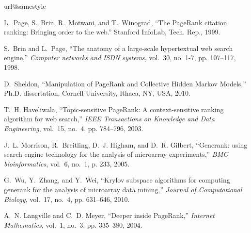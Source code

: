 \documentclass[conference]{IEEEtran}
\begin{document}
\else
\begin{thebibliography}{10}
\providecommand{\url}[1]{#1}
\csname url@samestyle\endcsname
\providecommand{\newblock}{\relax}
\providecommand{\bibinfo}[2]{#2}
\providecommand{\BIBentrySTDinterwordspacing}{\spaceskip=0pt\relax}
\providecommand{\BIBentryALTinterwordstretchfactor}{4}
\providecommand{\BIBentryALTinterwordspacing}{\spaceskip=\fontdimen2\font plus
\BIBentryALTinterwordstretchfactor\fontdimen3\font minus
  \fontdimen4\font\relax}
\providecommand{\BIBforeignlanguage}[2]{{%
\expandafter\ifx\csname l@#1\endcsname\relax
\typeout{** WARNING: IEEEtran.bst: No hyphenation pattern has been}%
\typeout{** loaded for the language `#1'. Using the pattern for}%
\typeout{** the default language instead.}%
\else
\language=\csname l@#1\endcsname
\fi
#2}}
\providecommand{\BIBdecl}{\relax}
\BIBdecl

L.~Page, S.~Brin, R.~Motwani, and T.~Winograd, ``The {P}age{R}ank citation
  ranking: Bringing order to the web.'' Stanford InfoLab, Tech. Rep., 1999.

S.~Brin and L.~Page, ``The anatomy of a large-scale hypertextual web search
  engine,'' \emph{Computer networks and ISDN systems}, vol.~30, no. 1-7, pp.
  107--117, 1998.

D.~Sheldon, ``Manipulation of {P}age{R}ank and {C}ollective {H}idden {M}arkov
  {M}odels,'' Ph.D. dissertation, Cornell University, Ithaca, NY, USA, 2010.

T.~H. Haveliwala, ``Topic-sensitive {P}age{R}ank: A context-sensitive ranking
  algorithm for web search,'' \emph{IEEE Transactions on Knowledge and Data
  Engineering}, vol.~15, no.~4, pp. 784--796, 2003.

J.~L. Morrison, R.~Breitling, D.~J. Higham, and D.~R. Gilbert, ``Generank:
  using search engine technology for the analysis of microarray experiments,''
  \emph{BMC bioinformatics}, vol.~6, no.~1, p. 233, 2005.

G.~Wu, Y.~Zhang, and Y.~Wei, ``Krylov subspace algorithms for computing
  generank for the analysis of microarray data mining,'' \emph{Journal of
  Computational Biology}, vol.~17, no.~4, pp. 631--646, 2010.

A.~N. Langville and C.~D. Meyer, ``Deeper inside {P}age{R}ank,'' \emph{Internet
  Mathematics}, vol.~1, no.~3, pp. 335--380, 2004.


\end{thebibliography}
\end{document}

